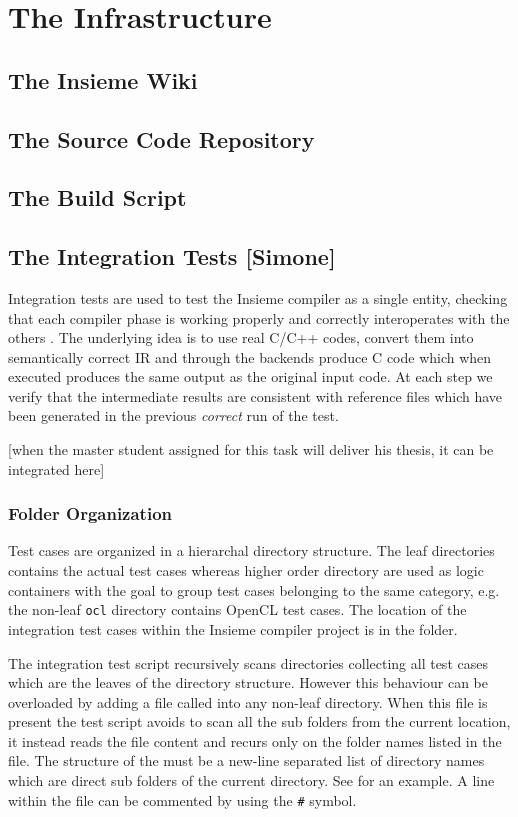 \chapter{The Infrastructure} \label{cap:infrastructure}

\section{The Insieme Wiki}
\section{The Source Code Repository}

\section{The Build Script} \label{sec:Infrastructure.Build}

\section{The Integration Tests [Simone]}

Integration tests are used to test the Insieme compiler as a single entity,
checking that each compiler phase is working properly and correctly
interoperates with the others . The underlying idea is to
use real C/C++ codes, convert them into semantically correct IR and through the
backends produce C code which when executed produces the same output as the
original input code. At each step we verify that the intermediate results are
consistent with reference files which have been generated in the previous {\em
correct} run of the test. 

[when the master student assigned for this task will deliver his thesis, it can
be integrated here]

\subsection{Folder Organization}
Test cases are organized in a hierarchal directory structure. The leaf
directories contains the actual test cases whereas higher order directory are
used as logic containers with the goal to group test cases belonging to the same
category, e.g. the non-leaf {\tt ocl} directory contains OpenCL test cases. The
location of the integration test cases within the Insieme compiler project is in
the  folder. 

The integration test script recursively scans directories collecting all test
cases which are the leaves of the directory structure. However this behaviour
can be overloaded by adding a file called  into any
non-leaf directory. When this file is present the test script avoids to scan all
the sub folders from the current location, it instead reads the file content and
recurs only on the folder names listed in the  file.
The structure of the  must be a new-line separated list of
directory names which are direct sub folders of the current directory. See
 for an example. A line within the  file can
be commented by using the {\tt \#} symbol. 

